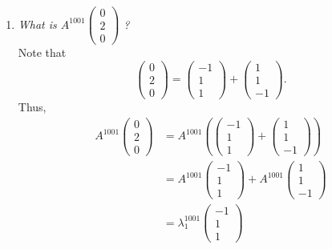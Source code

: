 \documentclass[12pt]{article}
\begin{document}
\begin{enumerate}[label=(\alph*)]
	\item \textit{What is
		$A^{1001} \begin{pmatrix} 0 \\ 2 \\ 0 \end{pmatrix}$
	?}
	\\[\baselineskip]
	Note that
	\begin{equation*}
		\begin{pmatrix} 0 \\ 2 \\ 0 \end{pmatrix}
		=
		\begin{pmatrix} -1 \\ 1 \\ 1 \end{pmatrix}
		+
		\begin{pmatrix} 1 \\ 1 \\ -1 \end{pmatrix}
		.
	\end{equation*}
	Thus,
	\begin{align*}
		A^{1001} \begin{pmatrix} 0 \\ 2 \\ 0 \end{pmatrix}
		&=
		A^{1001} \left(
			\begin{pmatrix} -1 \\ 1 \\ 1 \end{pmatrix}
			+
			\begin{pmatrix} 1 \\ 1 \\ -1 \end{pmatrix}
		\right)
		\\
		&=
		A^{1001} \begin{pmatrix} -1 \\ 1 \\ 1 \end{pmatrix}
		+
		A^{1001} \begin{pmatrix} 1 \\ 1 \\ -1 \end{pmatrix}
		\\
		&=
		\lambda_{1}^{1001} \begin{pmatrix} -1 \\ 1 \\ 1 \end{pmatrix}

\end{align*}
\end{enumerate}
\end{document}
